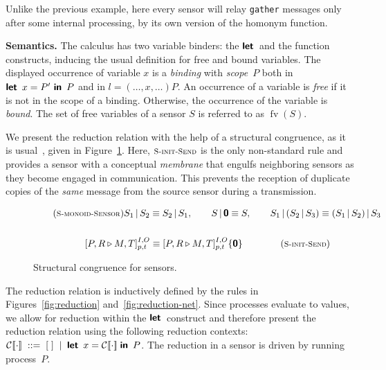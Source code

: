 \documentclass[copyright,creativecommons]{eptcs}
\newcommand{\keyw}[1]{\textbf{\textsf{#1}}\,}
\newcommand{\inaction}{\textbf{\textsf{0}}}
\newcommand{\ink}{\keyw{in}}
\newcommand{\letk}{\keyw{let}}
\newcommand{\sensor}[6]{[{#1} \triangleright {#2}]^{{#3}, {#4}}_{{#5}, {#6}}}
\newcommand{\tagsensor}[7]{[{#1}\triangleright{#2}]^{{#3}, {#4}}_{{#5}, {#6}}\{{#7}\}}
\newcommand{\parn}{\,\vert\,}
\def\emptycontext{[\;]}
\newcommand{\fv}{\operatorname{fv}}
\newcommand{\congr}{\equiv}
\newcommand{\mkSrule}[1]{{\footnotesize \textsc{S-#1}}}
\newcommand{\SmonoidSensor}{\mkSrule{monoid-Sensor}}
\newcommand{\SinitSend}{\mkSrule{init-Send}}
\newcommand{\pad}{\;\;}
\newcommand{\Space}[1]{\pad{#1}\pad}
\newcommand{\grmeq}{\Space{::=}}
\newcommand{\grmor}{\;\mid\;}
\newcommand{\myparagraph}[1]{\vspace*{0.2cm}\noindent\textbf{#1}}
\begin{document}
Unlike the previous example, here every sensor will relay
\lstinline{gather} messages only after some internal processing, by
its own version of the homonym function.

\myparagraph{Semantics.}
\label{sec:semantics}
The calculus has two variable binders: the $\letk$ and the function
constructs, inducing the usual definition for free and bound variables.
The displayed occurrence of variable $x$ is a \emph{binding} with
\emph{scope}~$P$ both in $\letk\ x=P'\ \ink\ P$ and in
$l = (\dots, x, \dots) P$.
An occurrence of a variable is \emph{free} if it is not in the scope of a
binding.
Otherwise, the occurrence of the variable is \emph{bound}.
The set of free variables of a sensor $S$ is referred to as $\fv(S)$.

We present the reduction relation with the help of a structural
congruence, as it is usual~\cite{ccs:milner:80},
given in Figure~\ref{fig:congruence}.
Here, $\SinitSend$ is the only non-standard rule and provides a sensor
with a conceptual \emph{membrane} that engulfs neighboring sensors as
they become engaged in communication. This prevents the reception of
duplicate copies of the \emph{same} message from the source sensor
during a transmission.


\begin{figure}
  \begin{gather*}
    \tag{\SmonoidSensor} S_1 \parn S_2 \congr S_2 \parn S_1, \qquad S \parn \inaction \congr S, \qquad  S_1 \parn (S_2 \parn S_3)  \congr (S_1 \parn S_2) \parn S_3 \\ \\
    \sensor {P,R} {M,T} I O p t \congr \tagsensor {P,R} {M,T} I O p
t {\inaction} \qquad \tag{\SinitSend}
  \end{gather*}
\caption{Structural congruence for sensors.}
\label{fig:congruence}
\end{figure}


The reduction relation is inductively defined by the rules in
Figures~\ref{fig:reduction} and~\ref{fig:reduction-net}.
Since processes evaluate to values, we allow for reduction within the
$\letk$ construct and therefore present the reduction relation using
the following reduction contexts: $\context{\cdot} \grmeq \emptycontext
\grmor \letk\ x=\context{\cdot} \;\ink\ P$.
The reduction in a sensor is driven by running process~$P$.
\end{document}
